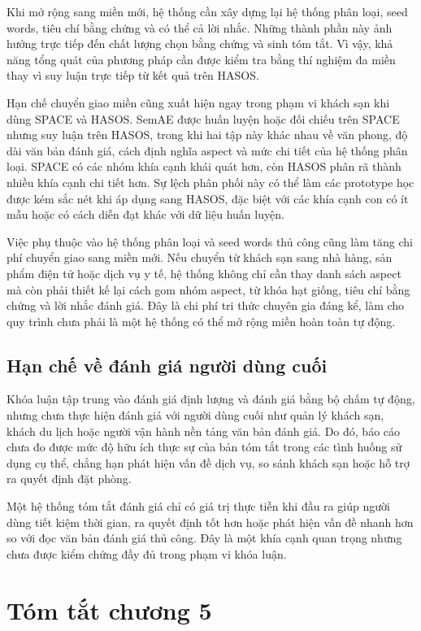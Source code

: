 Khi mở rộng sang miền mới, hệ thống cần xây dựng lại hệ thống phân loại, seed words, tiêu chí bằng chứng và có thể cả lời nhắc. Những thành phần này ảnh hưởng trực tiếp đến chất lượng chọn bằng chứng và sinh tóm tắt. Vì vậy, khả năng tổng quát của phương pháp cần được kiểm tra bằng thí nghiệm đa miền thay vì suy luận trực tiếp từ kết quả trên HASOS.

Hạn chế chuyển giao miền cũng xuất hiện ngay trong phạm vi khách sạn khi dùng SPACE và HASOS. SemAE được huấn luyện hoặc đối chiếu trên SPACE nhưng suy luận trên HASOS, trong khi hai tập này khác nhau về văn phong, độ dài văn bản đánh giá, cách định nghĩa aspect và mức chi tiết của hệ thống phân loại. SPACE có các nhóm khía cạnh khái quát hơn, còn HASOS phân rã thành nhiều khía cạnh chi tiết hơn. Sự lệch phân phối này có thể làm các prototype học được kém sắc nét khi áp dụng sang HASOS, đặc biệt với các khía cạnh con có ít mẫu hoặc có cách diễn đạt khác với dữ liệu huấn luyện.

Việc phụ thuộc vào hệ thống phân loại và seed words thủ công cũng làm tăng chi phí chuyển giao sang miền mới. Nếu chuyển từ khách sạn sang nhà hàng, sản phẩm điện tử hoặc dịch vụ y tế, hệ thống không chỉ cần thay danh sách aspect mà còn phải thiết kế lại cách gom nhóm aspect, từ khóa hạt giống, tiêu chí bằng chứng và lời nhắc đánh giá. Đây là chi phí tri thức chuyên gia đáng kể, làm cho quy trình chưa phải là một hệ thống có thể mở rộng miền hoàn toàn tự động.

\subsection{Hạn chế về đánh giá người dùng cuối}

Khóa luận tập trung vào đánh giá định lượng và đánh giá bằng bộ chấm tự động, nhưng chưa thực hiện đánh giá với người dùng cuối như quản lý khách sạn, khách du lịch hoặc người vận hành nền tảng văn bản đánh giá. Do đó, báo cáo chưa đo được mức độ hữu ích thực sự của bản tóm tắt trong các tình huống sử dụng cụ thể, chẳng hạn phát hiện vấn đề dịch vụ, so sánh khách sạn hoặc hỗ trợ ra quyết định đặt phòng.

Một hệ thống tóm tắt đánh giá chỉ có giá trị thực tiễn khi đầu ra giúp người dùng tiết kiệm thời gian, ra quyết định tốt hơn hoặc phát hiện vấn đề nhanh hơn so với đọc văn bản đánh giá thủ công. Đây là một khía cạnh quan trọng nhưng chưa được kiểm chứng đầy đủ trong phạm vi khóa luận.
\section*{Tóm tắt chương 5}
\label{sec:chap5-tom-tat}

